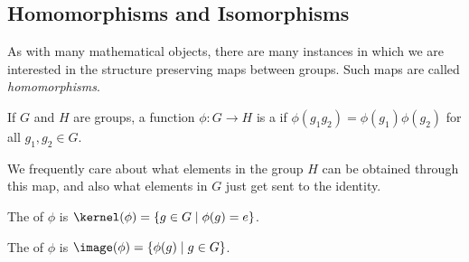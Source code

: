 \documentclass[a4paper]{scrartcl}
\begin{document}




\subsection{Homomorphisms and Isomorphisms}

As with many mathematical objects, there are many instances in which we are interested in the structure preserving maps between groups. Such maps are called 
\emph{homomorphisms}.

\begin{definition}[Homomorphism]
  If $G$ and $H$ are groups, a function $\phi: G \rightarrow H$ is a  if
  $
  \phi(g_1 g_2) = \phi(g_1) \phi(g_2)
  $
  for all $g_1, g_2 \in G$.
\end{definition}

We frequently care about what elements in the group $H$ can be obtained through this map, and also what elements in $G$ just get sent to the identity. 

\begin{definition}[Kernel]
	The  of $\phi$ is $\kernel(\phi) = \{ g \in G \mid \phi(g) = e\}$.
\end{definition}
\begin{definition}[Image]
	The  of $\phi$ is $\image(\phi) = \{ \phi(g) \mid g \in G\}$. 
\end{definition}
\end{document}
